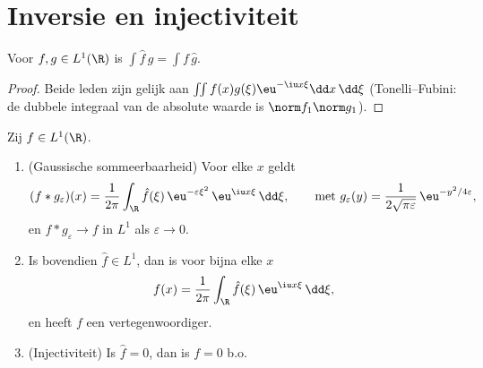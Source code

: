 \section{Inversie en injectiviteit}

\begin{lemma}[Vermenigvuldigingsformule]
\label{lem:b3:fouriertransform:multiplication}
Voor $f, g \in L^1(\R)$ is $\displaystyle\int \hat f\,g = \int
f\,\hat g$.
\end{lemma}

\begin{proof}
Beide leden zijn gelijk aan $\iint f(x)g(\xi)\eu^{-\iu x\xi}\dd
x\,\dd\xi$ (Tonelli--Fubini: de dubbele integraal van de absolute
waarde is $\norm f_1\norm g_1$).
\end{proof}

\begin{theorem}[Inversie]\label{thm:b3:fouriertransform:inversion}
Zij $f \in L^1(\R)$.
\begin{enumerate}
  \item (Gaussische sommeerbaarheid) Voor elke $x$ geldt
        \[
        (f * g_\varepsilon)(x) =
        \frac1{2\pi}\int_\R \hat f(\xi)\,
        \eu^{-\varepsilon\xi^2}\,\eu^{\iu x\xi}\,\dd\xi,
        \qquad\text{met } g_\varepsilon(y) =
        \frac{1}{2\sqrt{\pi\varepsilon}}\,
        \eu^{-y^2/4\varepsilon},
        \]
        en $f * g_\varepsilon \to f$ in $L^1$ als $\varepsilon
        \to 0$.
  \item Is bovendien $\hat f \in L^1$, dan is voor bijna elke
        $x$
        \[
        f(x) = \frac{1}{2\pi}\int_\R \hat
        f(\xi)\,\eu^{\iu x\xi}\,\dd\xi ,
        \]
        en heeft $f$ een  vertegenwoordiger.
  \item (Injectiviteit) Is $\hat f = 0$, dan is $f = 0$ b.o.
\end{enumerate}
\end{theorem}

